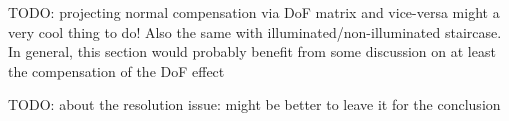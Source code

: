 {\color{red} TODO: projecting normal compensation via DoF matrix and vice-versa might a very cool thing to do! Also the same with illuminated/non-illuminated staircase. In general, this section would probably benefit from some discussion on at least the compensation of the DoF effect}

{\color{red} TODO: about the resolution issue: might be better to leave it for the conclusion}